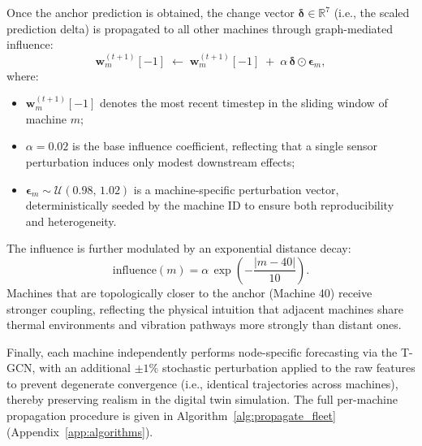 Once the anchor prediction is obtained, the change vector $\boldsymbol{\delta} \in \mathbb{R}^{7}$ (i.e., the scaled prediction delta) is propagated to all other machines through graph-mediated influence:
\begin{equation}
\mathbf{w}_m^{(t+1)}[-1] \;\leftarrow\;
\mathbf{w}_m^{(t+1)}[-1] \;+\;
\alpha \,\boldsymbol{\delta} \odot \boldsymbol{\epsilon}_m,
\end{equation}
where:
\begin{itemize}
    \item $\mathbf{w}_m^{(t+1)}[-1]$ denotes the most recent timestep in the sliding window of machine $m$;
    \item $\alpha = 0.02$ is the base influence coefficient, reflecting that a single sensor perturbation induces only modest downstream effects;
    \item $\boldsymbol{\epsilon}_m \sim \mathcal{U}(0.98,\, 1.02)$ is a machine-specific perturbation vector, deterministically seeded by the machine ID to ensure both reproducibility and heterogeneity.
\end{itemize}

The influence is further modulated by an exponential distance decay:
\begin{equation}
\mathrm{influence}(m) =
\alpha \,\exp\!\left(-\frac{|m - 40|}{10}\right).
\end{equation}
Machines that are topologically closer to the anchor (Machine 40) receive stronger coupling, reflecting the physical intuition that adjacent machines share thermal environments and vibration pathways more strongly than distant ones.

Finally, each machine independently performs node-specific forecasting via the T-GCN, with an additional $\pm 1\%$ stochastic perturbation applied to the raw features to prevent degenerate convergence (i.e., identical trajectories across machines), thereby preserving realism in the digital twin simulation. The full per-machine propagation procedure is given in Algorithm~\ref{alg:propagate_fleet} (Appendix~\ref{app:algorithms}).
